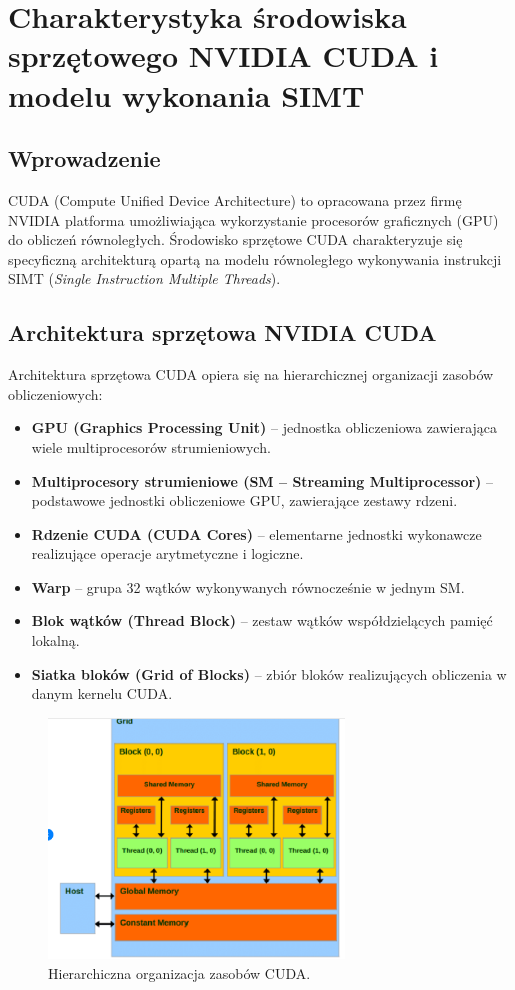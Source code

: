 \section{Charakterystyka środowiska sprzętowego NVIDIA CUDA i modelu wykonania SIMT}

\subsection{Wprowadzenie}
CUDA (Compute Unified Device Architecture) to opracowana przez firmę NVIDIA platforma umożliwiająca wykorzystanie procesorów graficznych (GPU) do obliczeń równoległych. Środowisko sprzętowe CUDA charakteryzuje się specyficzną architekturą opartą na modelu równoległego wykonywania instrukcji SIMT (\textit{Single Instruction Multiple Threads}).

\subsection{Architektura sprzętowa NVIDIA CUDA}

Architektura sprzętowa CUDA opiera się na hierarchicznej organizacji zasobów obliczeniowych:
\begin{itemize}
    \item \textbf{GPU (Graphics Processing Unit)} – jednostka obliczeniowa zawierająca wiele multiprocesorów strumieniowych.
    \item \textbf{Multiprocesory strumieniowe (SM – Streaming Multiprocessor)} – podstawowe jednostki obliczeniowe GPU, zawierające zestawy rdzeni.
    \item \textbf{Rdzenie CUDA (CUDA Cores)} – elementarne jednostki wykonawcze realizujące operacje arytmetyczne i logiczne.
    \item \textbf{Warp} – grupa 32 wątków wykonywanych równocześnie w jednym SM.
    \item \textbf{Blok wątków (Thread Block)} – zestaw wątków współdzielących pamięć lokalną.
    \item \textbf{Siatka bloków (Grid of Blocks)} – zbiór bloków realizujących obliczenia w danym kernelu CUDA.
\end{itemize}

\begin{figure}[h]
    \centering
    \includegraphics[width=0.7\textwidth]{cuda_architecture.png}
    \caption{Hierarchiczna organizacja zasobów CUDA.}
\end{figure}

